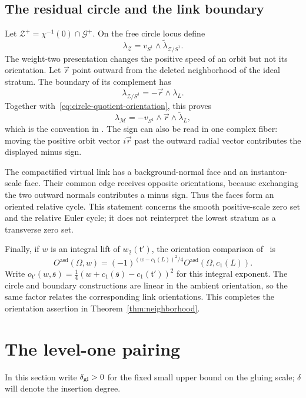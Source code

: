 \documentclass[11pt]{amsart}
\theoremstyle{definition}
\theoremstyle{remark}
\theoremstyle{plain}
\newcommand{\cG}{\mathcal{G}}
\newcommand{\cM}{\mathcal{M}}
\newcommand{\cZ}{\mathcal{Z}}
\begin{document}
\subsection{The residual circle and the link boundary}
Let $\cZ^+=\chi^{-1}(0)\cap\cG^+$.  On the free circle locus define
\begin{equation}\label{eq:circle-quotient-orientation}
 \lambda_{\cZ}=v_{S^1}\wedge\widetilde\lambda_{\cZ/S^1}.
\end{equation}
The weight-two presentation changes the positive speed of an orbit but not
its orientation.  Let $\vec r$ point outward from the deleted neighborhood
of the ideal stratum.  The boundary of its complement has
\[
 \lambda_{\cZ/S^1}=-\vec r\wedge\lambda_L.
\]
Together with~\eqref{eq:circle-quotient-orientation}, this proves
\begin{equation}\label{eq:link-orientation}
 \lambda_{\cM}=-v_{S^1}\wedge\vec r
 \wedge\widetilde\lambda_L,
\end{equation}
which is the convention in
\cite[Equation~(3.81)]{FeehanLenessLevelOne}.  The sign can also be read in
one complex fiber: moving the positive orbit vector $i\vec r$ past the
outward radial vector contributes the displayed minus sign.

The compactified virtual link has a background-normal face and an
instanton-scale face.  Their common edge receives opposite orientations,
because exchanging the two outward normals contributes a minus sign.  Thus
the faces form an oriented relative cycle.  This statement concerns the
smooth positive-scale zero set and the relative Euler cycle; it does not
reinterpret the lowest stratum as a transverse zero set.

Finally, if $w$ is an integral lift of $w_2(\mathfrak t')$, the orientation
comparison of~\cite{FeehanLenessII} is
\begin{equation}\label{eq:lift-orientation}
 O^{\mathrm{asd}}(\Omega,w)
 =(-1)^{(w-c_1(L))^2/4}
 O^{\mathrm{asd}}(\Omega,c_1(L)).
\end{equation}
Write $o_{\mathfrak t'}(w,\mathfrak s)
=\tfrac14(w+c_1(\mathfrak s)-c_1(\mathfrak t'))^2$ for this integral
exponent.  The circle and boundary constructions are linear
in the ambient orientation, so the same factor relates the corresponding
link orientations.  This completes the orientation assertion in
Theorem~\ref{thm:neighborhood}.

\section{The level-one pairing}\label{sec:pairing}
In this section write $\delta_{\rm gl}>0$ for the fixed small upper bound
on the gluing scale; $\delta$ will denote the insertion degree.
\end{document}
